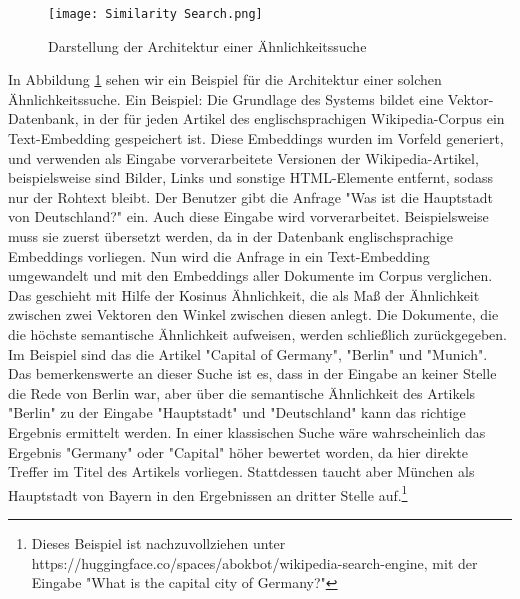 \begin{figure}[H]
    \centering
    \texttt{[image: Similarity Search.png]}
    \caption{Darstellung der Architektur einer Ähnlichkeitssuche}
    \label{SimilaritySearch}
\end{figure}

In Abbildung \ref{SimilaritySearch} sehen wir ein Beispiel für die Architektur einer solchen Ähnlichkeitssuche. Ein Beispiel: Die Grundlage des Systems bildet eine Vektor-Datenbank, in der für jeden Artikel des englischsprachigen Wikipedia-Corpus ein Text-Embedding gespeichert ist. Diese Embeddings wurden im Vorfeld generiert, und verwenden als Eingabe vorverarbeitete Versionen der Wikipedia-Artikel, beispielsweise sind Bilder, Links und sonstige HTML-Elemente entfernt, sodass nur der Rohtext bleibt. Der Benutzer gibt die Anfrage "Was ist die Hauptstadt von Deutschland?" ein. Auch diese Eingabe wird vorverarbeitet. Beispielsweise muss sie zuerst übersetzt werden, da in der Datenbank englischsprachige Embeddings vorliegen. Nun wird die Anfrage in ein Text-Embedding umgewandelt und mit den Embeddings aller Dokumente im Corpus verglichen. Das geschieht mit Hilfe der Kosinus Ähnlichkeit, die als Maß der Ähnlichkeit zwischen zwei Vektoren den Winkel zwischen diesen anlegt. Die Dokumente, die die höchste semantische Ähnlichkeit aufweisen, werden schließlich zurückgegeben. Im Beispiel sind das die Artikel "Capital of Germany", "Berlin" und "Munich". Das bemerkenswerte an dieser Suche ist es, dass in der Eingabe an keiner Stelle die Rede von Berlin war, aber über die semantische Ähnlichkeit des Artikels "Berlin" zu der Eingabe "Hauptstadt" und "Deutschland" kann das richtige Ergebnis ermittelt werden. In einer klassischen Suche wäre wahrscheinlich das Ergebnis "Germany" oder "Capital" höher bewertet worden, da hier direkte Treffer im Titel des Artikels vorliegen. Stattdessen taucht aber München als Hauptstadt von Bayern in den Ergebnissen an dritter Stelle auf.\footnote{Dieses Beispiel ist nachzuvollziehen unter https://huggingface.co/spaces/abokbot/wikipedia-search-engine, mit der Eingabe "What is the capital city of Germany?"}


